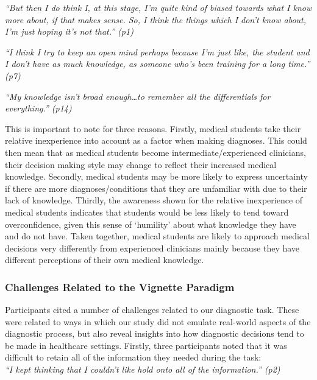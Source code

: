 \documentclass[a4paper, nobind]{templates/ociamthesis}
\begin{document}
\emph{``But then I do think I, at this stage, I'm quite kind of biased towards what I know more about, if that makes sense. So, I think the things which I don't know about, I'm just hoping it's not that.'' (p1)}

\emph{``I think I try to keep an open mind perhaps because I'm just like, the student and I don't have as much knowledge, as someone who's been training for a long time.'' (p7)}

\emph{``My knowledge isn't broad enough\ldots to remember all the differentials for everything.'' (p14)}

\hfill\break
This is important to note for three reasons. Firstly, medical students take their relative inexperience into account as a factor when making diagnoses. This could then mean that as medical students become intermediate/experienced clinicians, their decision making style may change to reflect their increased medical knowledge. Secondly, medical students may be more likely to express uncertainty if there are more diagnoses/conditions that they are unfamiliar with due to their lack of knowledge. Thirdly, the awareness shown for the relative inexperience of medical students indicates that students would be less likely to tend toward overconfidence, given this sense of `humility' about what knowledge they have and do not have. Taken together, medical students are likely to approach medical decisions very differently from experienced clinicians mainly because they have different perceptions of their own medical knowledge.

\subsubsection*{Challenges Related to the Vignette Paradigm}\label{challenges-related-to-the-vignette-paradigm}

Participants cited a number of challenges related to our diagnostic task. These were related to ways in which our study did not emulate real-world aspects of the diagnostic process, but also reveal insights into how diagnostic decisions tend to be made in healthcare settings. Firstly, three participants noted that it was difficult to retain all of the information they needed during the task:\\

\emph{``I kept thinking that I couldn't like hold onto all of the information.'' (p2)}
\end{document}
